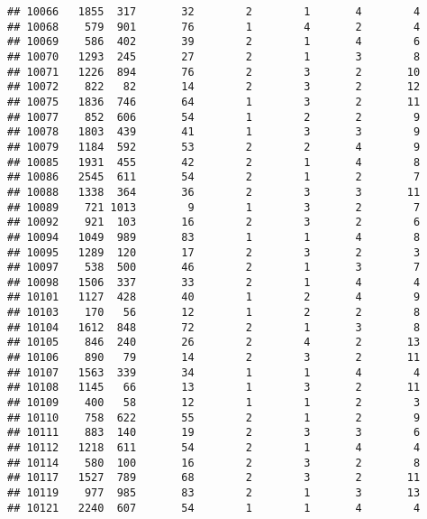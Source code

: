 \documentclass[]{article}
\newenvironment{Shaded}{\begin{snugshade}}{\end{snugshade}}
\newcommand{\KeywordTok}[1]{\textcolor[rgb]{0.13,0.29,0.53}{\textbf{#1}}}
\newcommand{\DataTypeTok}[1]{\textcolor[rgb]{0.13,0.29,0.53}{#1}}
\newcommand{\StringTok}[1]{\textcolor[rgb]{0.31,0.60,0.02}{#1}}
\newcommand{\CommentTok}[1]{\textcolor[rgb]{0.56,0.35,0.01}{\textit{#1}}}
\newcommand{\OperatorTok}[1]{\textcolor[rgb]{0.81,0.36,0.00}{\textbf{#1}}}
\newcommand{\NormalTok}[1]{#1}
\begin{document}
\begin{verbatim}
## 10066   1855  317       32        2        1       4        4
## 10068    579  901       76        1        4       2        4
## 10069    586  402       39        2        1       4        6
## 10070   1293  245       27        2        1       3        8
## 10071   1226  894       76        2        3       2       10
## 10072    822   82       14        2        3       2       12
## 10075   1836  746       64        1        3       2       11
## 10077    852  606       54        1        2       2        9
## 10078   1803  439       41        1        3       3        9
## 10079   1184  592       53        2        2       4        9
## 10085   1931  455       42        2        1       4        8
## 10086   2545  611       54        2        1       2        7
## 10088   1338  364       36        2        3       3       11
## 10089    721 1013        9        1        3       2        7
## 10092    921  103       16        2        3       2        6
## 10094   1049  989       83        1        1       4        8
## 10095   1289  120       17        2        3       2        3
## 10097    538  500       46        2        1       3        7
## 10098   1506  337       33        2        1       4        4
## 10101   1127  428       40        1        2       4        9
## 10103    170   56       12        1        2       2        8
## 10104   1612  848       72        2        1       3        8
## 10105    846  240       26        2        4       2       13
## 10106    890   79       14        2        3       2       11
## 10107   1563  339       34        1        1       4        4
## 10108   1145   66       13        1        3       2       11
## 10109    400   58       12        1        1       2        3
## 10110    758  622       55        2        1       2        9
## 10111    883  140       19        2        3       3        6
## 10112   1218  611       54        2        1       4        4
## 10114    580  100       16        2        3       2        8
## 10117   1527  789       68        2        3       2       11
## 10119    977  985       83        2        1       3       13
## 10121   2240  607       54        1        1       4        4
\end{verbatim}

\begin{Shaded}
\end{Shaded}
\end{document}
